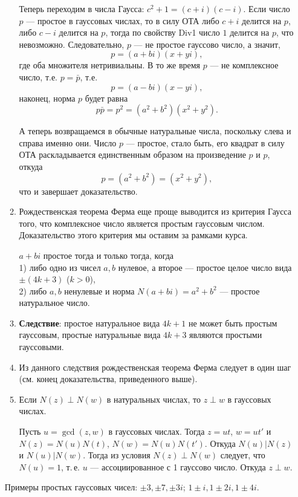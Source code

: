 \begin{enumerate}
\begin{enumerate}
Теперь переходим в числа Гаусса: $c^2+1=(c+i)(c-i)$. Если число $p$ --- простое в гауссовых числах, то в силу ОТА либо $c+i$ делится на $p$, либо $c-i$ делится на $p$, тогда по свойству Div1 число $1$ делится на $p$, что невозможно. Следовательно, $p$ --- не простое гауссово число, а значит,
$$
p = (a+bi)(x+yi),
$$
где оба множителя нетривиальны. В то же время $p$ --- не комплексное число, т.е. $p=\bar p$, т.е.
$$
p = (a-bi)(x-yi),
$$
наконец, норма $p$ будет равна
$$
p\bar p=p^2=(a^2+b^2)(x^2+y^2).
$$

А теперь возвращаемся в обычные натуральные числа, поскольку слева и справа именно они. Число $p$ --- простое, стало быть, его квадрат в силу ОТА раскладывается единственным образом на произведение $p$ и $p$, откуда
$$
p=(a^2+b^2)=(x^2+y^2),
$$
что и завершает доказательство.
\epf

\item Рождественская теорема Ферма еще проще выводится из критерия Гаусса того, что комплексное число является простым гауссовым числом. Доказательство этого критерия мы оставим за рамками курса.
\begin{thrm}
$a+bi$ простое тогда и только тогда, когда\\
\textup{1)} либо одно из чисел $a,b$ нулевое, а второе --- простое целое число вида $\pm(4k+3)$ ($k>0$), \\
\textup{2)} либо $a,b$ ненулевые и норма $N(a+bi)=a^2+b^2$ --- простое натуральное число.
\end{thrm}
\item \textbf{Следствие}: простое натуральное вида $4k+1$ не может быть простым гауссовым, простые натуральные вида $4k+3$ являются простыми гауссовыми.

\item Из данного следствия рождественская теорема Ферма следует в один шаг (см. конец доказательства, приведенного выше).

\item Если $N(z)\perp N(w)$ в натуральных числах, то $z\perp w$ в гауссовых числах.

Пусть $u=\gcd(z,w)$ в гауссовых числах. Тогда $z=ut$, $w=ut'$ и $N(z)=N(u)N(t)$, $N(w)=N(u)N(t')$. Откуда $N(u)|N(z)$ и $N(u)|N(w)$. Тогда из условия $N(z)\perp N(w)$ следует, что $N(u)=1$, т.\,е. $u$ --- ассоциированное с 1 гауссово число. Откуда $z\perp w$.
\end{enumerate}
Примеры простых гауссовых чисел: $\pm 3, \pm 7, \pm 3i$; $1\pm i, 1\pm 2i, 1\pm 4i$.


\end{enumerate}
